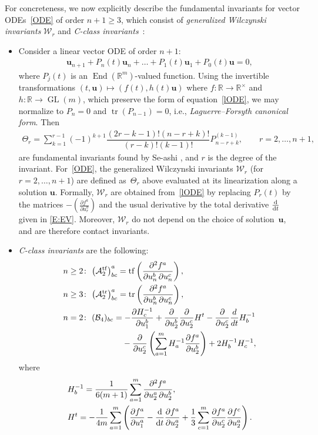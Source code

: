 \documentclass[pdftex]{sigma}%
\DeclareMathOperator{\homo}{End}
\DeclareMathOperator{\tf}{tf}
\DeclareMathOperator{\tr}{tr}
\newcommand\bu{\mathbf{u}}
\newcommand{\R}{\mathbb{R}}
\newcommand\cA{\mathcal{A}}
\newcommand\cB{\mathcal{B}}
\newcommand\cW{\mathcal{W}}
\numberwithin{equation}{section}
\begin{document}
For concreteness, we now explicitly describe the fundamental invariants for vector ODEs~\eqref{ODE} of order $n+1 \ge 3$, which consist of {\em generalized Wilczynski invariants} $\cW_r$ \cite{Doubrov2008} and {\em C-class invariants}~\cite{DM2014, Medvedev2010,Medvedev2011}:
\begin{itemize}\itemsep=0pt
\item Consider a linear vector ODE of order $n+1$:
\begin{align} \label{lODE}
\bu_{n+1} + P_n(t)\bu_n+ \dots + P_1(t)\bu_1 + P_0(t)\bu = 0,
\end{align}
where $P_j(t)$ is an $\homo(\R^m)$-valued function. Using the invertible transformations $(t,\bu) \mapsto (f(t), h(t)\bu)$ where $f\colon \R \to \R^\times$ and $h\colon \R \to \operatorname{GL}(m)$, which preserve the form of equation~\eqref{lODE}, we may normalize to $P_n = 0$ and $\tr(P_{n-1}) = 0$, i.e., {\em Laguerre--Forsyth canonical form}. Then
\begin{align*}%
\Theta_{r} =
\sum_{k=1}^{r-1}(-1)^{k+1}\dfrac{(2r-k-1)!(n-r+k)!}{(r-k)!(k-1)!}P_{n-r+k}^{(k-1)}, \qquad r=2,\dots,n+1,
\end{align*}
 are fundamental invariants found by Se-ashi \cite{Se-ashi1988}, and $r$ is the degree of the invariant. For~\eqref{ODE}, the generalized Wilczynski invariants $\cW_r$ (for $r=2,\dots,n+1$) are defined as~$\Theta_r$ above evaluated at its linearization along a solution $\bu$. Formally, $\cW_r$ are obtained from~\eqref{lODE} by replacing $P_r(t)$ by the matrices $-\left(\frac{\partial f^a}{\partial u_r^b}\right)$ and the usual derivative by the total derivative $\frac{\rm d}{{\rm d}t}$ given in \eqref{E:EV}. Moreover, $\cW_r$ do not depend on the choice of solution~$\bu$, and are therefore contact invariants.
\item {\em C-class invariants} are the following:
\begin{align*}
&n \geq 2\colon\ {\bigl(\cA_2^{\tf}\bigr)}^a_{bc} =\tf\left( \frac{\partial^2{f}^a}{\partial{u_n^b}\, \partial{u_n^c}}\right), \\
&n \geq 3\colon\ {\bigl(\cA_2^{\tr}\bigr)}^a_{bc} =\tr\left( \frac{\partial^2{f}^a}{\partial{u_n^b}\, \partial{u_n^c}}\right), \\
&n = 2\colon\ (\cB_4)_{bc}= -\frac{\partial H_c^{-1}}{\partial u_{1}^b}+ \frac{\partial}{\partial u_2^b} \frac{\partial}{\partial u_2^c}{H^t}-\frac{\partial}{\partial u_2^c}\frac{d}{dt}{H^{-1}_b} \\
&\hphantom{n = 2\colon\ (\cB_4)_{bc}= }{} -\frac{\partial}{\partial u_2^c}\left(\sum_{a=1}^m H_a^{-1}\frac{\partial f^a}{\partial u_2^b}\right) + 2H^{-1}_b H^{-1}_c,
\end{align*}
where
\begin{align*}
&H_b^{-1} = \frac{1}{6(m+1)} \sum_{a=1}^m \frac{\partial^2{f}^a}{\partial{u_2^a}\, \partial{u_2^b}}, \\
&H^t = -\frac{1}{4m} \sum_{a=1}^m \left( \frac{\partial f^a}{\partial u_{1}^a}-\frac{{\rm d}}{{\rm d}t}\frac{\partial f^a}{\partial u_{2}^a}+ \frac{1}{3} \sum_{c=1}^m \frac{\partial f^a}{\partial u_2^c} \frac{\partial f^c}{\partial u_2^a}\right).
\end{align*}
\end{itemize}
\end{document}
